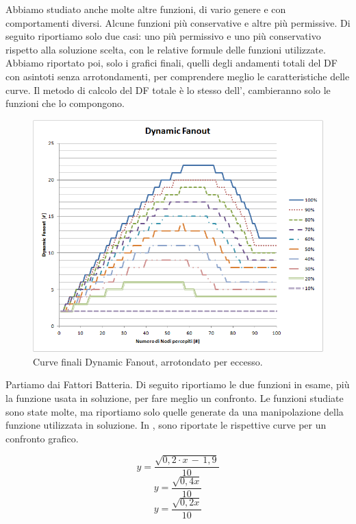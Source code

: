 Abbiamo studiato anche molte altre funzioni, di vario genere e con comportamenti diversi. Alcune funzioni più conservative e altre più permissive. Di seguito riportiamo solo due casi: uno più permissivo e uno più conservativo rispetto alla soluzione scelta, con le relative formule delle funzioni utilizzate. Abbiamo riportato poi, solo i grafici finali, quelli degli andamenti totali del DF con asintoti senza arrotondamenti, per comprendere meglio le caratteristiche delle curve. Il metodo di calcolo del DF totale è lo stesso dell',  cambieranno solo le funzioni che lo compongono.

\begin{figure}[t]
	\centering
	\includegraphics[width=0.9\linewidth]{Images/grafici_usati/DF_tot_arr}
	\caption[DF totale arrotondato]{Curve finali Dynamic Fanout, arrotondato per eccesso.}
	\label{fig:DF_tot_arr}
\end{figure}

Partiamo dai Fattori Batteria. Di seguito riportiamo le due funzioni in esame, più la funzione usata in soluzione, per fare meglio un confronto. Le funzioni studiate sono state molte, ma riportiamo solo quelle generate da una manipolazione della funzione utilizzata in soluzione. In , sono riportate le rispettive curve per un confronto grafico.

\begin{equation}
	\label{eq:df_bis_bat_sol}
	y=\dfrac{\sqrt{0,2\cdot x\,-\,1,9}}{10}
\end{equation}
\begin{equation}
	\label{eq:df_bis_bat_perm}
	y=\dfrac{\sqrt{0,4x}}{10}
\end{equation}
\begin{equation}
	\label{eq:df_bis_bat_cons}
	y=\dfrac{\sqrt{0,2x}}{10}
\end{equation}

